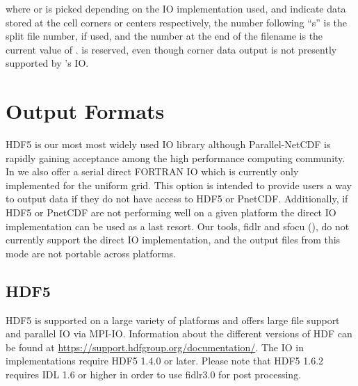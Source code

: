 \noindent
where  or  is picked depending on the IO
implementation used,
 and  indicate data stored at the
cell corners or centers respectively, the number following ``s'' is the split file 
number, if used, and the number at the end of the
filename is the current value of .   is reserved, even though 
corner data output is not presently supported by \flashx's IO.

\begin{comment}
Similarly, the general particle filename is:
\medskip

\texttt{
basename\_$\left\{\begin{array}{c}\mathtt{hdf5}\\ \mathtt{ncmpi}\\
             \end{array}\right\}$\_part\_0000}\enskip,
\medskip

\noindent
where \code{hdf5} or \code{ncmpi} is picked depending on the IO
implementation
used, and the number at the end of the filename is the current value in 
\code{particleFileNumber}.
\end{comment}




\section{Output Formats}\label{Sec:Output formats}


HDF5 is our most most widely used IO library although
Parallel-NetCDF is rapidly gaining acceptance among the high
performance computing community.  In \flashx we also offer a serial
direct FORTRAN IO which is currently only implemented for the
uniform grid.  This option is intended to provide users a way to output data
if they do not have access to HDF5 or PnetCDF.  Additionally,
if HDF5 or PnetCDF are not performing well on a given platform the
direct IO implementation can be used as a last resort.  Our tools,
fidlr and sfocu (), do not currently support the
direct IO implementation, and the output files from this mode are not portable
across platforms.



\subsection{HDF5}
\label{Sec:HDF5}
HDF5%
is supported on a large variety of platforms and
offers large file support and parallel IO via MPI-IO.  Information
about the different versions of HDF can be found at
\url{https://support.hdfgroup.org/documentation/}.
The IO in \flashx
implementations require HDF5 1.4.0 or later.  Please note that HDF5
1.6.2 requires IDL 1.6 or higher in order to use fidlr3.0 for post processing.


